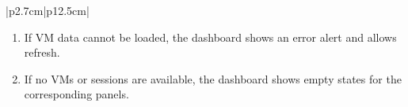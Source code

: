 \begin{table}[H]
\begin{tabular}{|p{2.7cm}|p{12.5cm}|}
\begin{minipage}[t]{\linewidth}
\begin{enumerate}[topsep=0pt,itemsep=1pt,parsep=0pt,partopsep=0pt]
                                              \item If VM data cannot be loaded, the dashboard shows an error alert and allows
                                                    refresh.
                                              \item If no VMs or sessions are available, the dashboard shows empty states for the
                                                    corresponding panels.
                                          \end{enumerate}
                                      \end{minipage}                                                                                                                                                                                                                                           \\
            \hline
        \end{tabular}
        \label{tab:eng-consult-vm-dashboard}
    \end{table}
